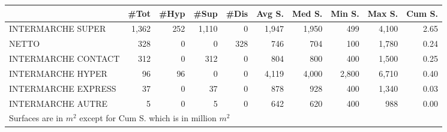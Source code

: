 \documentclass[11pt]{article}
\begin{document}
\begin{table}[H]
\footnotesize
\setlength{\tabcolsep}{2pt}

\begin{tabular}{lrrrrrrrrr}
\toprule
\toprule
{} &       \#Tot &       \#Hyp &       \#Sup &       \#Dis &     Avg S. &     Med S. &     Min S. &     Max S. &     Cum S. \\
\midrule
INTERMARCHE SUPER   &      1,362 &        252 &      1,110 &          0 &      1,947 &      1,950 &        499 &      4,100 &       2.65 \\
NETTO               &        328 &          0 &          0 &        328 &        746 &        704 &        100 &      1,780 &       0.24 \\
INTERMARCHE CONTACT &        312 &          0 &        312 &          0 &        804 &        800 &        400 &      1,500 &       0.25 \\
INTERMARCHE HYPER   &         96 &         96 &          0 &          0 &      4,119 &      4,000 &      2,800 &      6,710 &       0.40 \\
INTERMARCHE EXPRESS &         37 &          0 &         37 &          0 &        878 &        928 &        400 &      1,340 &       0.03 \\
INTERMARCHE AUTRE   &          5 &          0 &          5 &          0 &        642 &        620 &        400 &        988 &       0.00 \\
\bottomrule
\multicolumn{10}{l}{\footnotesize Surfaces are in $m^2$ except for Cum S. which is in million $m^2$} \\
\end{tabular}

\end{table}
\end{document}
